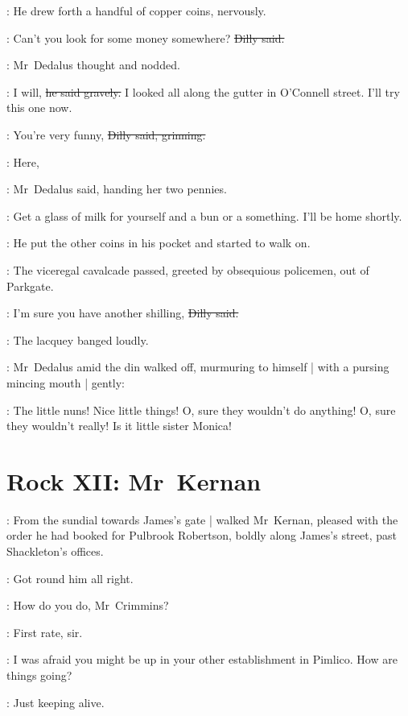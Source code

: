 :
He drew forth a handful of copper coins,%
nervously.

\dilly:
Can't you look for some money somewhere?
\sout{Dilly said.}

:
Mr~Dedalus thought and nodded.

\simon:
I will,
\sout{he said gravely.}
I looked all along the gutter in O'Connell street.
I'll try this one now.

\dilly:
You're very funny,
\sout{Dilly said, grinning.}

\simon:
Here,

:
Mr~Dedalus said,
handing her two pennies.

\simon:
Get a glass of milk for yourself
and a bun or a something.
I'll be home shortly.

:
He put the other coins in his pocket and started to walk on.

\begin{interject}
    :
    The viceregal cavalcade passed,
    greeted by obsequious policemen,
    out of Parkgate.
\end{interject}%

\dilly:
I'm sure you have another shilling,
\sout{Dilly said.}

:
The lacquey banged loudly.

:
Mr~Dedalus amid the din walked off,
murmuring to himself |
with a pursing mincing mouth |
gently:

\simon:
The little nuns!
Nice little things!
O, sure they wouldn't do anything!
O, sure they wouldn't really!
Is it little sister Monica!


\section*{Rock XII: Mr~Kernan}


:
From the sundial
towards James's gate |
walked Mr~Kernan,
pleased with the order he had booked for Pulbrook Robertson,
boldly along James's street,
past Shackleton's offices.%

:
Got round him all right.

:
How do you do, Mr~Crimmins?

\crimmins:
First rate, sir.

:
I was afraid you might be up in your other establishment in Pimlico.
How are things going?

\crimmins:
Just keeping alive.

